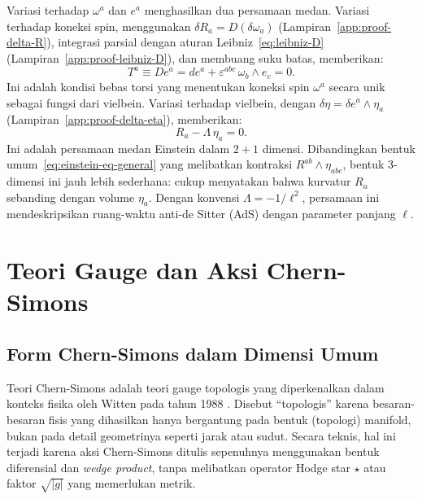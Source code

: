 Variasi terhadap $\omega^a$ dan $e^a$ menghasilkan dua persamaan medan. Variasi terhadap koneksi spin, menggunakan $\delta R_a = D(\delta\omega_a)$ (Lampiran~\ref{app:proof-delta-R}), integrasi parsial dengan aturan Leibniz~\eqref{eq:leibniz-D} (Lampiran~\ref{app:proof-leibniz-D}), dan membuang suku batas, memberikan:
\begin{equation}\label{eq:torsion-free}
    T^a \equiv De^a = de^a + \varepsilon^{abc}\, \omega_b \wedge e_c = 0.
\end{equation}
Ini adalah kondisi bebas torsi yang menentukan koneksi spin $\omega^a$ secara unik sebagai fungsi dari vielbein. Variasi terhadap vielbein, dengan $\delta\eta = \delta e^a \wedge \eta_a$ (Lampiran~\ref{app:proof-delta-eta}), memberikan:
\begin{equation}\label{eq:einstein-eq}
    R_a - \Lambda\, \eta_a = 0.
\end{equation}
Ini adalah persamaan medan Einstein dalam $2+1$ dimensi. Dibandingkan bentuk umum~\eqref{eq:einstein-eq-general} yang melibatkan kontraksi $R^{ab} \wedge \eta_{abc}$, bentuk 3-dimensi ini jauh lebih sederhana: cukup menyatakan bahwa kurvatur $R_a$ sebanding dengan volume $\eta_a$. Dengan konvensi $\Lambda = -1/\ell^2$, persamaan ini mendeskripsikan ruang-waktu anti-de Sitter (AdS) dengan parameter panjang $\ell$.

\section{Teori Gauge dan Aksi Chern-Simons}
\label{sec:chern-simons}

\subsection{Form Chern-Simons dalam Dimensi Umum}
\label{subsec:cs-general}

Teori Chern-Simons adalah teori gauge topologis yang diperkenalkan dalam konteks fisika oleh Witten pada tahun 1988 \cite{witten1988}. Disebut ``topologis'' karena besaran-besaran fisis yang dihasilkan hanya bergantung pada bentuk (topologi) manifold, bukan pada detail geometrinya seperti jarak atau sudut. Secara teknis, hal ini terjadi karena aksi Chern-Simons ditulis sepenuhnya menggunakan bentuk diferensial dan \textit{wedge product}, tanpa melibatkan operator Hodge star $\star$ atau faktor $\sqrt{|g|}$ yang memerlukan metrik.

